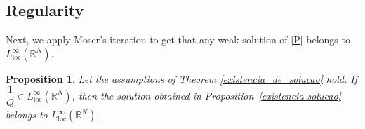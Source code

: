 \documentclass[12pt]{amsart}
\newtheorem{proposition}[theorem]{Proposition}
\newcommand{\R}{\mathbb{R}}
\begin{document}
\vspace{0,5cm}

\subsection{Regularity}

Next, we apply Moser’s iteration to get that any weak solution of \eqref{P} belongs to $L^\infty_{\mathrm{loc}}(\mathbb{R}^N)$.



    \begin{proposition}
	Let the assumptions of Theorem \ref{existencia_de_solucao} hold. If $\dfrac{1}{Q}\in L^\infty_{\mathrm{loc}}(\R^N)$, then the solution obtained in Proposition~\ref{existencia-solucao} belongs to $L^\infty_{\mathrm{loc}}(\mathbb{R}^N)$.
\end{proposition}
\end{document}
